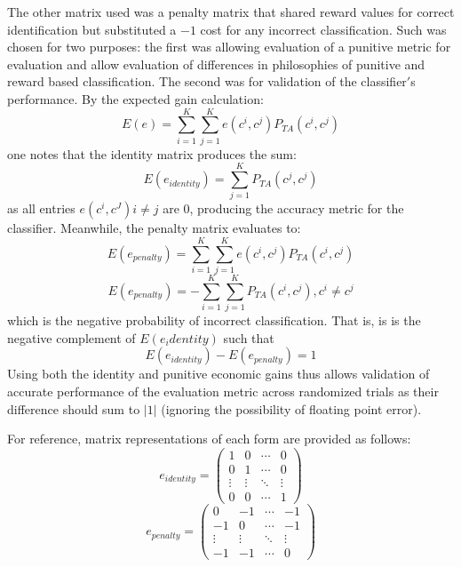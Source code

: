 \documentclass[10pt, conference]{IEEEtran}
\begin{document}
The other matrix used was a penalty matrix that shared reward values for correct identification but substituted a $-1$ cost for any incorrect classification. Such was chosen for two purposes: the first was allowing evaluation of a punitive metric for evaluation and allow evaluation of differences in philosophies of punitive and reward based classification. The second was for validation of the classifier$'$s performance. By the expected gain calculation:
\begin{equation}
E(e) =  \sum_{i=1}^K \sum_{j=1}^K e(c^i,c^j)P_{TA}(c^i, c^j)
\end{equation}
one notes that the identity matrix produces the sum:
\begin{equation}
E(e_{identity}) =  \sum_{j=1}^K P_{TA}(c^j, c^j)
\end{equation}
as all entries $e(c^i,c^J) i \neq j$ are 0, producing the accuracy metric for the classifier. Meanwhile, the penalty matrix evaluates to:
\begin{equation*}
E(e_{penalty}) =  \sum_{i=1}^K \sum_{j=1}^K e(c^i,c^j)P_{TA}(c^i, c^j) 
\end{equation*}
\begin{equation}
E(e_{penalty}) =  -\sum_{i=1}^K \sum_{j=1}^K P_{TA}(c^i, c^j) , c^i \neq c^j
\end{equation}
which is the negative probability of incorrect classification. That is, is is the negative complement of $E(e_identity)$ such that
\begin{equation}
E(e_{identity}) - E(e_{penalty}) = 1 
\end{equation}
Using both the identity and punitive economic gains thus allows validation of accurate performance of the evaluation metric across randomized trials as their difference should sum to $|1|$ (ignoring the possibility of floating point error).

For reference, matrix representations of each form are provided as follows:
\begin{equation}
e_{identity} = 
\begin{pmatrix}
1 & 0 & \cdots & 0 \\
0 & 1 & \cdots & 0 \\
\vdots  & \vdots  & \ddots & \vdots  \\
0 & 0 & \cdots & 1 
\end{pmatrix}
\end{equation}
\begin{equation}
e_{penalty} = 
\begin{pmatrix}
0 & -1 & \cdots & -1 \\
-1 & 0  & \cdots & -1 \\
\vdots  & \vdots  & \ddots & \vdots  \\
-1 & -1 & \cdots & 0
\end{pmatrix}
\end{equation}
\end{document}
